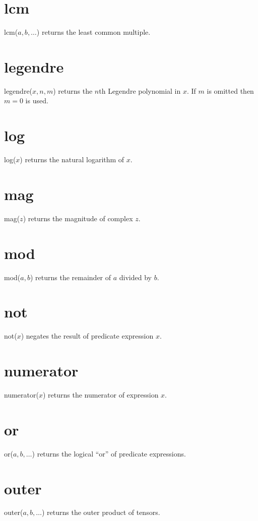 \documentclass[11pt]{article}
\begin{document}
\section*{lcm}
lcm($a,b,\ldots$) returns the least common multiple.

\section*{legendre}
legendre($x,n,m$) returns the $n$th Legendre polynomial in $x$.
If $m$ is omitted then $m=0$ is used.

\section*{log}
log($x$) returns the natural logarithm of $x$.

\section*{mag}
mag($z$) returns the magnitude of complex $z$.

\section*{mod}
mod($a,b$) returns the remainder of $a$ divided by $b$.

\section*{not}
not($x$) negates the result of predicate expression $x$.

\section*{numerator}
numerator($x$) returns the numerator of expression $x$.

\section*{or}
or($a,b,\ldots$) returns the logical ``or'' of predicate expressions.

\section*{outer}
outer($a,b,\ldots$) returns the outer product of tensors.
\end{document}
